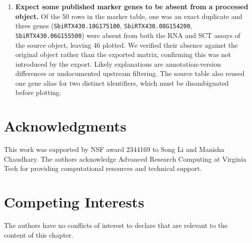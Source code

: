 \begin{enumerate}[leftmargin=*]
\item \textbf{Expect some published marker genes to be absent from a processed object.} Of the 50 rows in the marker table, one was an exact duplicate and three genes (\texttt{SbiRTX430.10G175100}, \texttt{SbiRTX430.08G154200}, \texttt{SbiRTX430.06G155500}) were absent from both the RNA and SCT assays of the source object, leaving 46 plotted. We verified their absence against the original object rather than the exported matrix, confirming this was not introduced by the export. Likely explanations are annotation-version differences or undocumented upstream filtering. The source table also reused one gene alias for two distinct identifiers, which must be disambiguated before plotting.

\end{enumerate}

\section*{Acknowledgments}

This work was supported by NSF award 2344169 to Song Li and Manisha Chaudhary. The authors acknowledge Advanced Research Computing at Virginia Tech for providing computational resources and technical support.

\section*{Competing Interests}

The authors have no conflicts of interest to declare that are relevant to the content of this chapter.



